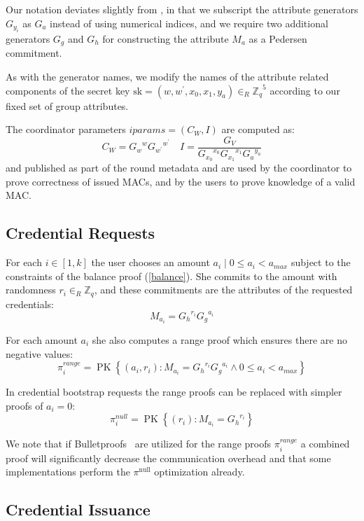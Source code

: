 \documentclass{article}
\begin{document}
Our notation deviates slightly from \cite{chase2019signal}, in that we subscript the attribute generators $G_{y_i}$ as $G_a$ instead of using numerical indices, and we require two additional generators $G_g$ and $G_h$ for constructing the attribute $M_a$ as a Pedersen commitment.

As with the generator names, we modify the names of the attribute related components of the secret key
$\mathrm{sk} = (w, w^{\prime}, x_{0}, x_{1}, y_{a}) \in_R {\mathbb{Z}_q}^5$
according to our fixed set of group attributes.

The coordinator parameters
$\mathit{iparams} =  (C_{W}, I)$
are computed as:
\[
C_{W}={G_w}^{w} {G_{w^\prime}}^{w^\prime}
\quad
I=\frac{G_{V}}{{G_{x_0}}^{x_0} {G_{x_1}}^{x_1} {G_a}^{y_a} }
\]
and published as part of the round metadata and are used by the coordinator to prove correctness of issued MACs, and by the users to prove knowledge of a valid MAC.

\subsection{Credential Requests}

For each $i \in [1, k]$ the user chooses an amount $a_i \mid 0 \leq a_i < a_{\mathit{max}}$ subject to the constraints of the balance proof (\cref{balance}). She commits to the amount with randomness $r_i \in_R \mathbb{Z}_q$, and these commitments are the attributes of the requested credentials:
\[ M_{a_i}={G_h}^{r_i}{G_g}^{a_i} \]

For each amount $a_i$ she also computes a range proof which ensures there are no negative values:
\[
\pi^{\mathit{range}}_i = \operatorname{PK}\left\{\left(a_i, r_i \right) :
M_{a_i} = {G_h}^{r_i}{G_g}^{a_i}
\land
0 \leq a_i < a_{\mathit{max}} \right\}
\]

In credential bootstrap requests the range proofs can be replaced with simpler proofs of $a_i = 0$:
\[
  \pi^{\mathit{null}}_i = \operatorname{PK}\left\{ \left( r_i\right) :
    M_{a_i} = {G_{h}}^{r_i}
  \right\}
\]

We note that if Bulletproofs~\cite{bunz2018bulletproofs} are utilized for the range proofs $\pi^{\textit{range}}_i$ a combined proof will significantly decrease the communication overhead and that some implementations perform the $\pi^{\mathrm{null}}$ optimization already.

\subsection{Credential Issuance}
\end{document}
